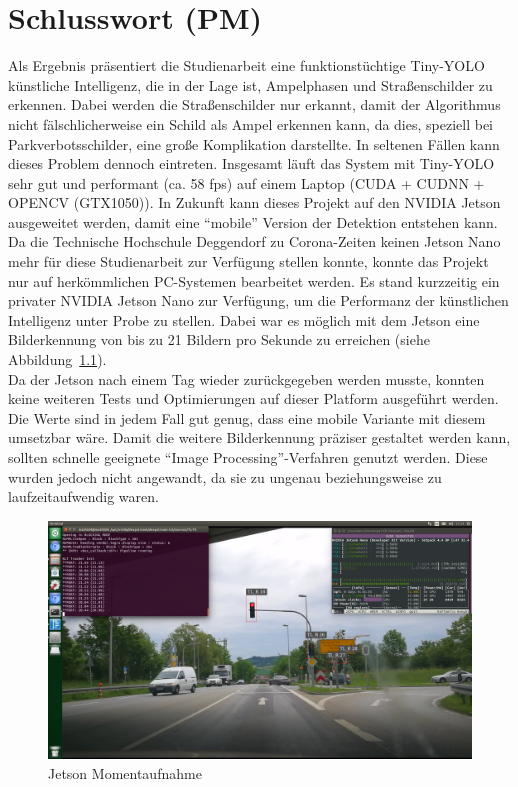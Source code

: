 \documentclass[a4paper,oneside,12pt]{report}
\begin{document}
	\chapter{Schlusswort (PM)}
	\begin{onehalfspace}
		Als Ergebnis präsentiert die Studienarbeit eine funktionstüchtige Tiny-YOLO künstliche Intelligenz, die in der Lage ist, Ampelphasen und Straßenschilder zu erkennen. Dabei werden die Straßenschilder nur erkannt, damit der Algorithmus nicht fälschlicherweise ein Schild als Ampel erkennen kann, da dies, speziell bei Parkverbotsschilder, eine große Komplikation darstellte. In seltenen Fällen kann dieses Problem dennoch eintreten. Insgesamt läuft das System mit Tiny-YOLO sehr gut und performant (ca. 58 fps) auf einem Laptop (CUDA + CUDNN + OPENCV (GTX1050)). In Zukunft kann dieses Projekt auf den NVIDIA Jetson ausgeweitet werden, damit eine "`mobile"' Version der Detektion entstehen kann. Da die Technische Hochschule Deggendorf zu Corona-Zeiten keinen Jetson Nano mehr für diese Studienarbeit zur Verfügung stellen konnte, konnte das Projekt nur auf herkömmlichen PC-Systemen bearbeitet werden. Es stand kurzzeitig ein privater NVIDIA Jetson Nano zur Verfügung, um die Performanz der künstlichen Intelligenz unter Probe zu stellen. Dabei war es möglich mit dem Jetson eine Bilderkennung von bis zu 21 Bildern pro Sekunde zu erreichen (siehe Abbildung~\ref{fig:Jetson}).\\
		Da der Jetson nach einem Tag wieder zurückgegeben werden musste, konnten keine weiteren Tests und Optimierungen auf dieser Platform ausgeführt werden. Die Werte sind in jedem Fall gut genug, dass eine mobile Variante mit diesem umsetzbar wäre. Damit die weitere Bilderkennung präziser gestaltet werden kann, sollten schnelle geeignete "`Image Processing"'-Verfahren genutzt werden. Diese wurden jedoch nicht angewandt, da sie zu ungenau beziehungsweise zu laufzeitaufwendig waren.
		\begin{figure}[h!]
			\includegraphics[width=\linewidth]{Jetson.png}
			\caption{Jetson Momentaufnahme}
			\label{fig:Jetson}
		\end{figure}
	\end{onehalfspace}
	
\end{document}
